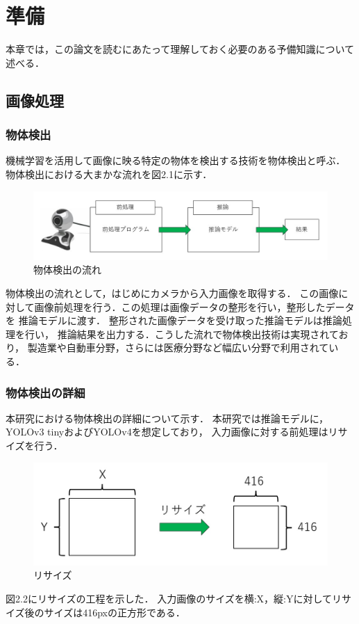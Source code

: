 \documentclass[11pt,a4j]{jreport}
\begin{document}
%
\chapter{準備}
本章では，この論文を読むにあたって理解しておく必要のある予備知識について述べる．
\section{画像処理}
\subsection{物体検出}
機械学習を活用して画像に映る特定の物体を検出する技術を物体検出と呼ぶ．
物体検出における大まかな流れを図2.1に示す．
\begin{figure}[H]
  \center
  \includegraphics[scale = 0.8]{pict/pict4.jpg}
  \caption{物体検出の流れ}
\end{figure}
物体検出の流れとして，はじめにカメラから入力画像を取得する．
この画像に対して画像前処理を行う．この処理は画像データの整形を行い，整形したデータを
推論モデルに渡す．
整形された画像データを受け取った推論モデルは推論処理を行い，
推論結果を出力する．こうした流れで物体検出技術は実現されており，
製造業や自動車分野，さらには医療分野など幅広い分野で利用されている．

\subsection{物体検出の詳細}
本研究における物体検出の詳細について示す．
本研究では推論モデルに，YOLOv3 tinyおよびYOLOv4を想定しており，
入力画像に対する前処理はリサイズを行う．
\begin{figure}[H]
  \center
  \includegraphics[scale = 0.8]{pict/pict5.jpg}
  \caption{リサイズ}
\end{figure}
図2.2にリサイズの工程を示した．
入力画像のサイズを横:X，縦:Yに対してリサイズ後のサイズは416pxの正方形である．
\end{document}
